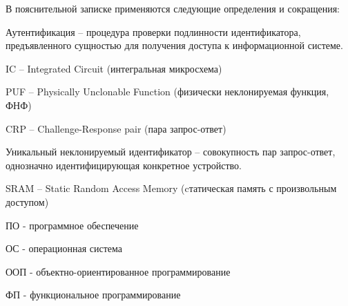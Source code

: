 
В пояснительной записке применяются следующие определения и сокращения:

Аутентификация -- процедура проверки подлинности идентификатора, предъявленного сущностью для получения доступа к информационной системе.

IC -- Integrated Circuit (интегральная микросхема)

PUF -- Physically Unclonable Function (физически неклонируемая функция, ФНФ)

CRP -- Challenge-Response pair (пара запрос-ответ)

Уникальный неклонируемый идентификатор -- совокупность пар запрос-ответ, однозначно идентифицирующая конкретное устройство.

SRAM -- Static Random Access Memory (cтатическая память с произвольным доступом)

ПО - программное обеспечение

ОС - операционная система

ООП - объектно-ориентированное программирование

ФП - функциональное программирование

\clearpage
